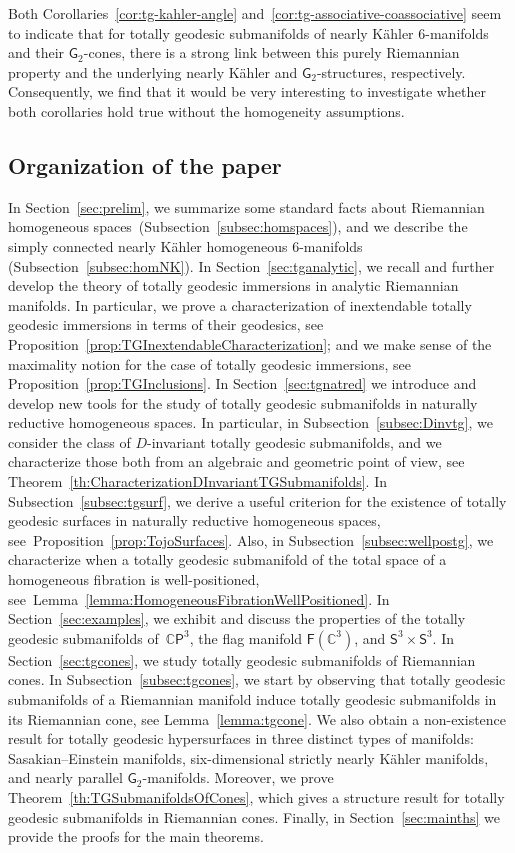 \documentclass[11pt,a4paper,final]{amsart}
\newcommand{\s}{\mathsf}
\newcommand{\C}{\mathbb{C}}
\theoremstyle{definition}
\begin{document}
Both Corollaries~\ref{cor:tg-kahler-angle} and~\ref{cor:tg-associative-coassociative} seem to indicate that for totally geodesic submanifolds of nearly Kähler $6$-manifolds and their $\s{G}_2$-cones, there is a strong link between this purely Riemannian property and the underlying nearly Kähler and $\s{G}_2$-structures, respectively.
Consequently, we find that it would be very interesting to investigate whether both corollaries hold true without the homogeneity assumptions.

\subsection*{Organization of the paper}
In Section~\ref{sec:prelim}, we summarize some standard facts about Riemannian homogeneous spaces~(Subsection~\ref{subsec:homspaces}), and we describe the simply connected nearly Kähler homogeneous $6$-manifolds (Subsection~\ref{subsec:homNK}).
In Section~\ref{sec:tganalytic}, we recall and further develop the theory of totally geodesic immersions in analytic Riemannian manifolds.
In particular, we prove a characterization of inextendable totally geodesic immersions in terms of their geodesics, see Proposition~\ref{prop:TGInextendableCharacterization}; and we make sense of the maximality notion for the case of totally geodesic immersions, see Proposition~\ref{prop:TGInclusions}.
In Section~\ref{sec:tgnatred} we introduce and develop new tools for the study of totally geodesic submanifolds in naturally reductive homogeneous spaces.
In particular, in Subsection~\ref{subsec:Dinvtg}, we consider the class of $D$-invariant totally geodesic submanifolds, and we characterize those both from an algebraic and geometric point of view, see Theorem~\ref{th:CharacterizationDInvariantTGSubmanifolds}.
In Subsection~\ref{subsec:tgsurf}, we derive a useful criterion for the existence of totally geodesic surfaces in naturally reductive homogeneous spaces, see~Proposition~\ref{prop:TojoSurfaces}.
Also, in Subsection~\ref{subsec:wellpostg}, we characterize when a totally geodesic submanifold of the total space of a homogeneous fibration is well-positioned, see~Lemma~\ref{lemma:HomogeneousFibrationWellPositioned}.
In Section~\ref{sec:examples}, we exhibit and discuss the properties of the totally geodesic submanifolds of~$\C\s{P}^3$, the flag manifold $\s{F}(\C^3)$, and $\s{S}^3\times \s{S}^3$. 
In Section~\ref{sec:tgcones}, we study totally geodesic submanifolds of Riemannian cones.
In Subsection~\ref{subsec:tgcones}, we start by observing that totally geodesic submanifolds of a Riemannian manifold induce totally geodesic submanifolds in its Riemannian cone, see Lemma~\ref{lemma:tgcone}.
We also obtain a non-existence result for totally geodesic hypersurfaces in three distinct types of manifolds: Sasakian--Einstein manifolds, six-dimensional strictly nearly Kähler manifolds, and nearly parallel $\mathsf{G}_{2}$-manifolds.
Moreover, we prove  Theorem~\ref{th:TGSubmanifoldsOfCones}, which gives a structure result for totally geodesic submanifolds in Riemannian cones.
Finally, in Section~\ref{sec:mainths} we provide the proofs for the main theorems. 
\end{document}
